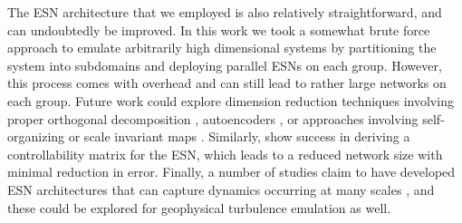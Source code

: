 The ESN architecture that we employed is also relatively straightforward, and
can undoubtedly be improved.
In this work we took a somewhat brute force approach to emulate arbitrarily
high dimensional systems by partitioning the system into subdomains and
deploying parallel ESNs on each group.
However, this process comes with overhead and can still lead to rather large
networks on each group.
Future work could explore dimension reduction techniques involving
proper orthogonal decomposition \citep{jordanou_investigation_2022},
autoencoders \citep{heyder_generalizability_2022},
or approaches involving self-organizing or scale invariant maps
\citep{basterrech_self-organizing_2011}.
Similarly, \citet{whiteaker_reducing_2022}
show success in deriving a controllability matrix for the
ESN, which leads to a reduced network size with minimal reduction in
error.
Finally, a number of studies claim to have developed ESN architectures that
can capture dynamics occurring at many scales
\citep{moon_hierarchical_2021,ma_deepr-esn_2020,gallicchio_design_2018,gallicchio_deep_2017,malik_multilayered_2017},
and these could be
explored for geophysical turbulence emulation as well.

